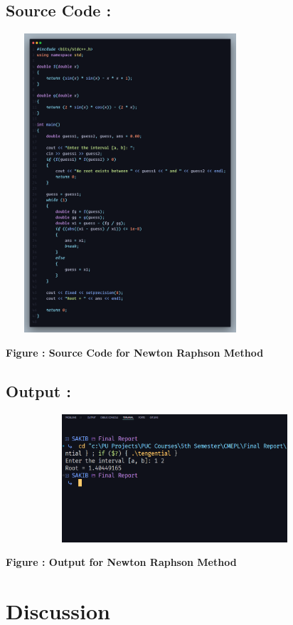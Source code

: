 \documentclass{scrreprt}
\begin{document}
\subsection*{Source Code : }
\begin{center}
    {\includegraphics[width=350px, height=420px]{newton_code.png}}
    \parbox{0.8\textwidth}{ 
        \centering
        \textbf{Figure : Source Code for Newton Raphson Method}
    }
\end{center}
\subsection*{Output : }
\begin{center}
    {\includegraphics[width=475px, height=180px]{newton_output.png}}
    \parbox{0.8\textwidth}{ 
        \centering
        \textbf{Figure : Output for Newton Raphson Method}
    }
\end{center}

\section*{Discussion}
\end{document}
